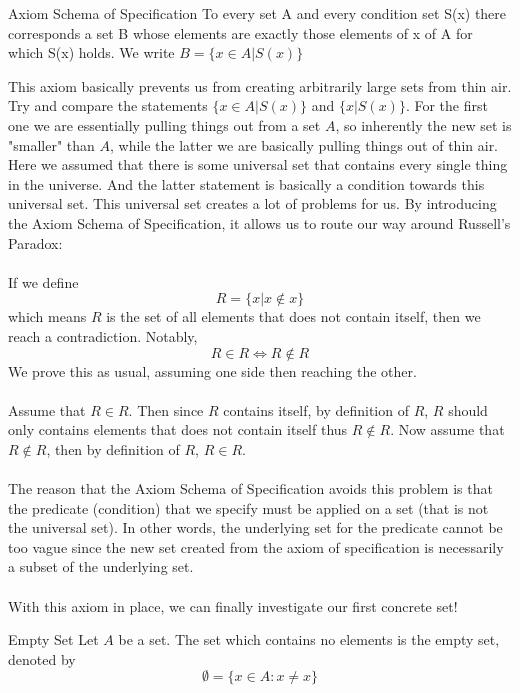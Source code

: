 \begin{axm}{Axiom Schema of Specification}{} To every set A and every condition set S(x) there corresponds a set B whose elements are exactly those elements of x of A for which S(x) holds. We write $B=\{x\in A|S(x)\}$
\end{axm}

This axiom basically prevents us from creating arbitrarily large sets from thin air. Try and compare the statements $\{x\in A|S(x)\}$ and $\{x|S(x)\}$. For the first one we are essentially pulling things out from a set $A$, so inherently the new set is "smaller" than $A$, while the latter we are basically pulling things out of thin air. Here we assumed that there is some universal set that contains every single thing in the universe. And the latter statement is basically a condition towards this universal set. This universal set creates a lot of problems for us. By introducing the Axiom Schema of Specification, it allows us to route our way around Russell's Paradox:\\~\\

If we define $$R=\{x|x\notin x\}$$ which means $R$ is the set of all elements that does not contain itself, then we reach a contradiction. Notably, $$R\in R\iff R\notin R$$ We prove this as usual, assuming one side then reaching the other. \\~\\
Assume that $R\in R$. Then since $R$ contains itself, by definition of $R$, $R$ should only contains elements that does not contain itself thus $R\notin R$. Now assume that $R\notin R$, then by definition of $R$, $R\in R$. \\~\\
The reason that the Axiom Schema of Specification avoids this problem is that the predicate (condition) that we specify must be applied on a set (that is not the universal set). In other words, the underlying set for the predicate cannot be too vague since the new set created from the axiom of specification is necessarily a subset of the underlying set. \\~\\
With this axiom in place, we can finally investigate our first concrete set!

\begin{defn}{Empty Set}{} Let $A$ be a set. The set which contains no elements is the empty set, denoted by $$\emptyset=\{x\in A:x\neq x\}$$
\end{defn}

